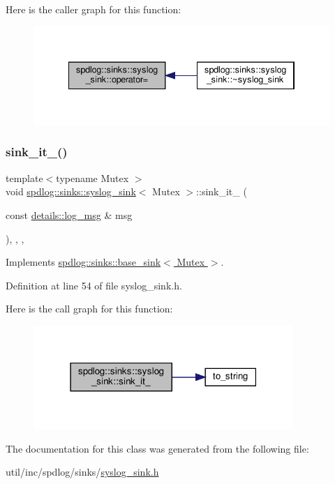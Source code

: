 Here is the caller graph for this function\+:
\nopagebreak
\begin{figure}[H]
\begin{center}
\leavevmode
\includegraphics[width=334pt]{classspdlog_1_1sinks_1_1syslog__sink_a3e2454370f91c3fe2befb3f24e25ede7_icgraph}
\end{center}
\end{figure}
\mbox{\label{classspdlog_1_1sinks_1_1syslog__sink_a303bccf40cd03356510391c493078005}} 
\subsubsection{\texorpdfstring{sink\+\_\+it\+\_\+()}{sink\_it\_()}}
{\footnotesize\ttfamily template$<$typename Mutex $>$ \\
void \hyperlink{classspdlog_1_1sinks_1_1syslog__sink}{spdlog\+::sinks\+::syslog\+\_\+sink}$<$ Mutex $>$\+::sink\+\_\+it\+\_\+ (\begin{DoxyParamCaption}\item[{const \hyperlink{structspdlog_1_1details_1_1log__msg}{details\+::log\+\_\+msg} \&}]{msg }\end{DoxyParamCaption})\hspace{0.3cm}{\ttfamily [inline]}, {\ttfamily [override]}, {\ttfamily [protected]}, {\ttfamily [virtual]}}



Implements \hyperlink{classspdlog_1_1sinks_1_1base__sink_ad698d300cb7f5e58b2aa1b9907cdbd87}{spdlog\+::sinks\+::base\+\_\+sink$<$ Mutex $>$}.



Definition at line 54 of file syslog\+\_\+sink.\+h.

Here is the call graph for this function\+:
\nopagebreak
\begin{figure}[H]
\begin{center}
\leavevmode
\includegraphics[width=279pt]{classspdlog_1_1sinks_1_1syslog__sink_a303bccf40cd03356510391c493078005_cgraph}
\end{center}
\end{figure}


The documentation for this class was generated from the following file\+:\begin{DoxyCompactItemize}
\item 
util/inc/spdlog/sinks/\hyperlink{syslog__sink_8h}{syslog\+\_\+sink.\+h}\end{DoxyCompactItemize}
